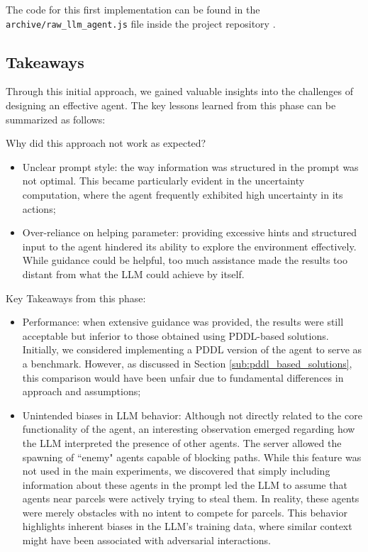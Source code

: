 The code for this first implementation can be found in the \texttt{archive/raw\_llm\_agent.js}
file inside the project repository \cite{projectrepo}.

\subsection{Takeaways}
Through this initial approach, we gained valuable insights into the challenges of
designing an effective agent. The key lessons learned from this phase can be
summarized as follows:

Why did this approach not work as expected?
\begin{itemize}
  \item Unclear prompt style: the way information was structured in the prompt
    was not optimal. This became particularly evident in the uncertainty computation,
    where the agent frequently exhibited high uncertainty in its actions;

  \item Over-reliance on helping parameter: providing excessive hints and
    structured input to the agent hindered its ability to explore the
    environment effectively. While guidance could be helpful, too much
    assistance made the results too distant from what the LLM could achieve by
    itself.
\end{itemize}

Key Takeaways from this phase:
\begin{itemize}
  \item Performance: when extensive guidance was provided, the results were still
    acceptable but inferior to those obtained using PDDL-based solutions.
    Initially, we considered implementing a PDDL version of the agent to serve as
    a benchmark. However, as discussed in Section \ref{sub:pddl_based_solutions},
    this comparison would have been unfair due to fundamental differences in
    approach and assumptions;

  \item Unintended biases in LLM behavior: Although not directly related to the
    core functionality of the agent, an interesting observation emerged regarding
    how the LLM interpreted the presence of other agents. The server allowed the
    spawning of ``enemy" agents capable of blocking paths. While this feature
    was not used in the main experiments, we discovered that simply including information
    about these agents in the prompt led the LLM to assume that agents near parcels
    were actively trying to steal them. In reality, these agents were merely obstacles
    with no intent to compete for parcels. This behavior highlights inherent
    biases in the LLM's training data, where similar context might have been associated
    with adversarial interactions.
\end{itemize}

